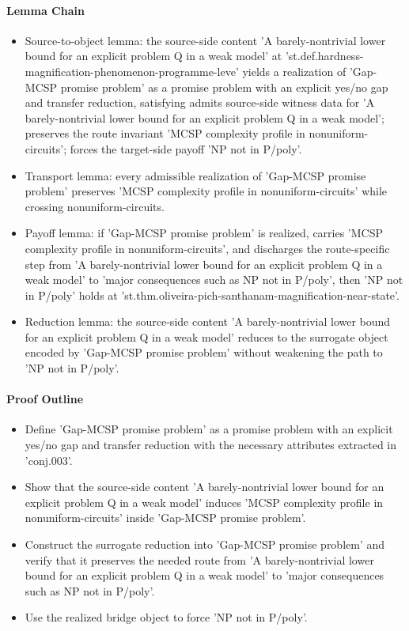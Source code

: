 \documentclass[11pt]{article}
\begin{document}
\paragraph{Lemma Chain}
\begin{itemize}[leftmargin=*,itemsep=0.2em]
\item Source-to-object lemma: the source-side content 'A barely-nontrivial lower bound for an explicit problem Q in a weak model' at 'st.def.hardness-magnification-phenomenon-programme-leve' yields a realization of 'Gap-MCSP promise problem' as a promise problem with an explicit yes/no gap and transfer reduction, satisfying admits source-side witness data for 'A barely-nontrivial lower bound for an explicit problem Q in a weak model'; preserves the route invariant 'MCSP complexity profile in nonuniform-circuits'; forces the target-side payoff 'NP not in P/poly'.
\item Transport lemma: every admissible realization of 'Gap-MCSP promise problem' preserves 'MCSP complexity profile in nonuniform-circuits' while crossing nonuniform-circuits.
\item Payoff lemma: if 'Gap-MCSP promise problem' is realized, carries 'MCSP complexity profile in nonuniform-circuits', and discharges the route-specific step from 'A barely-nontrivial lower bound for an explicit problem Q in a weak model' to 'major consequences such as NP not in P/poly', then 'NP not in P/poly' holds at 'st.thm.oliveira-pich-santhanam-magnification-near-state'.
\item Reduction lemma: the source-side content 'A barely-nontrivial lower bound for an explicit problem Q in a weak model' reduces to the surrogate object encoded by 'Gap-MCSP promise problem' without weakening the path to 'NP not in P/poly'.
\end{itemize}

\paragraph{Proof Outline}
\begin{itemize}[leftmargin=*,itemsep=0.2em]
\item Define 'Gap-MCSP promise problem' as a promise problem with an explicit yes/no gap and transfer reduction with the necessary attributes extracted in 'conj.003'.
\item Show that the source-side content 'A barely-nontrivial lower bound for an explicit problem Q in a weak model' induces 'MCSP complexity profile in nonuniform-circuits' inside 'Gap-MCSP promise problem'.
\item Construct the surrogate reduction into 'Gap-MCSP promise problem' and verify that it preserves the needed route from 'A barely-nontrivial lower bound for an explicit problem Q in a weak model' to 'major consequences such as NP not in P/poly'.
\item Use the realized bridge object to force 'NP not in P/poly'.
\end{itemize}
\end{document}
